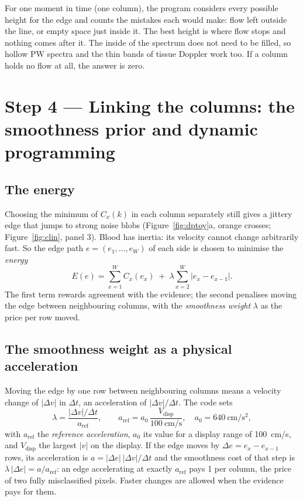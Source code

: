 \documentclass[11pt,a4paper]{article}
\begin{document}
\begin{plainbox}
For one moment in time (one column), the program considers every possible height for the edge and counts the
mistakes each would make: flow left outside the line, or empty space just inside it. The best height is where flow
stops and nothing comes after it. The inside of the spectrum does not need to be filled, so hollow PW spectra and the
thin bands of tissue Doppler work too. If a column holds no flow at all, the answer is zero.
\end{plainbox}

\section{Step 4 --- Linking the columns: the smoothness prior and dynamic programming}
\label{sec:dp}

\subsection{The energy}
Choosing the minimum of $C_x(k)$ in each column separately still gives a jittery edge that jumps to strong noise
blobs (Figure~\ref{fig:dptoy}a, orange crosses; Figure~\ref{fig:clin}, panel 3). Blood has inertia: its velocity
cannot change arbitrarily fast. So the edge path $e = (e_1, \dots, e_W)$ of each side is chosen to minimise the
\emph{energy}
\begin{equation}
E(e) = \sum_{x=1}^{W} C_x(e_x) \;+\; \lambda \sum_{x=2}^{W} |e_x - e_{x-1}|.
\label{eq:energy}
\end{equation}
The first term rewards agreement with the evidence; the second penalises moving the edge between neighbouring columns,
with the \emph{smoothness weight} $\lambda$ as the price per row moved.

\subsection{The smoothness weight as a physical acceleration}
Moving the edge by one row between neighbouring columns means a velocity change of $|\Delta v|$ in $\Delta t$, an
acceleration of $|\Delta v|/\Delta t$. The code sets
\begin{equation}
\lambda = \frac{|\Delta v| / \Delta t}{a_{\mathrm{ref}}}, \qquad a_{\mathrm{ref}} = a_0\,\frac{V_{\mathrm{disp}}}{100~\mathrm{cm/s}},
\quad a_0 = 640~\mathrm{cm/s^2},
\label{eq:lambda}
\end{equation}
with $a_{\mathrm{ref}}$ the \emph{reference acceleration}, $a_0$ its value for a display range of 100~cm/s, and
$V_{\mathrm{disp}}$ the largest $|v|$ on the display. If the edge moves by $\Delta e = e_x - e_{x-1}$ rows, its
acceleration is $a = |\Delta e|\,|\Delta v|/\Delta t$ and the smoothness cost of that step is
$\lambda\,|\Delta e| = a/a_{\mathrm{ref}}$: an edge accelerating at exactly $a_{\mathrm{ref}}$ pays 1 per column, the
price of two fully misclassified pixels. Faster changes are allowed when the evidence pays for them.
\end{document}
